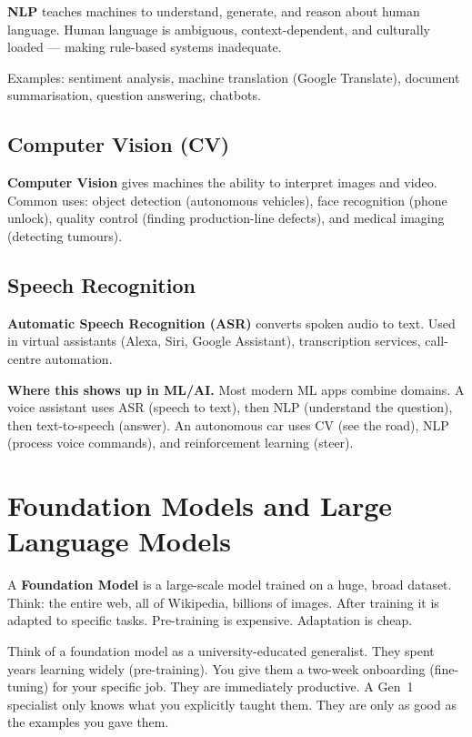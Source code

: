 \documentclass[a4paper,11pt]{article}
\newcommand{\vocab}[1]{\textbf{\color{navy}#1}}
\begin{document}
\vocab{NLP} teaches machines to understand, generate, and reason about human language. Human language is ambiguous, context-dependent, and culturally loaded --- making rule-based systems inadequate.

Examples: sentiment analysis, machine translation (Google Translate), document summarisation, question answering, chatbots.

\subsection{Computer Vision (CV)}

\vocab{Computer Vision} gives machines the ability to interpret images and video. Common uses: object detection (autonomous vehicles), face recognition (phone unlock), quality control (finding production-line defects), and medical imaging (detecting tumours).

\subsection{Speech Recognition}

\vocab{Automatic Speech Recognition (ASR)} converts spoken audio to text. Used in virtual assistants (Alexa, Siri, Google Assistant), transcription services, call-centre automation.

\noindent\textbf{Where this shows up in ML/AI.} Most modern ML apps combine domains. A voice assistant uses ASR (speech to text), then NLP (understand the question), then text-to-speech (answer). An autonomous car uses CV (see the road), NLP (process voice commands), and reinforcement learning (steer).

\section{Foundation Models and Large Language Models}

A \vocab{Foundation Model} is a large-scale model trained on a huge, broad dataset. Think: the entire web, all of Wikipedia, billions of images. After training it is adapted to specific tasks. Pre-training is expensive. Adaptation is cheap.

\begin{intuition}
Think of a foundation model as a university-educated generalist. They spent years learning widely (pre-training). You give them a two-week onboarding (fine-tuning) for your specific job. They are immediately productive. A Gen~1 specialist only knows what you explicitly taught them. They are only as good as the examples you gave them.
\end{intuition}
\end{document}
